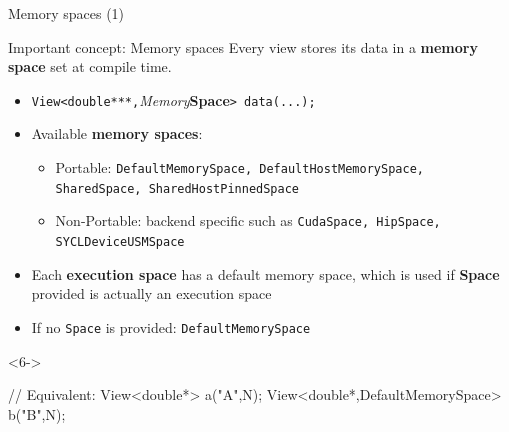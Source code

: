 \begin{frame}[fragile]{Memory spaces (1)}

  \begin{block}{Important concept: Memory spaces}
    Every view stores its data in a \textbf{memory space} set at compile time.
  \end{block}

  \vspace{5pt}

  \begin{itemize}
  \item<2->{\texttt{View<double***,}{\textit{Memory}\textbf{Space}}\texttt{> data(...);}}
  \item<3->{Available \textbf{memory spaces}:
\begin{itemize}
   \item Portable: \texttt{DefaultMemorySpace, DefaultHostMemorySpace, SharedSpace, SharedHostPinnedSpace} \\
   \item Non-Portable: backend specific such as \texttt{CudaSpace, HipSpace, SYCLDeviceUSMSpace}
\end{itemize}
}
  \item<4->{Each \textbf{execution space} has a default memory space, which is used if \textbf{Space} provided is actually an execution space}
  \item<5->{If no \texttt{Space} is provided: \texttt{DefaultMemorySpace}}
  \end{itemize}

  \begin{uncoverenv}<6->
  \begin{code}[keywords={View,DefaultExecutionSpace,memory_space}]
  // Equivalent:
  View<double*> a("A",N);
  View<double*,DefaultMemorySpace> b("B",N);
  \end{code}
  \end{uncoverenv}
\end{frame}


